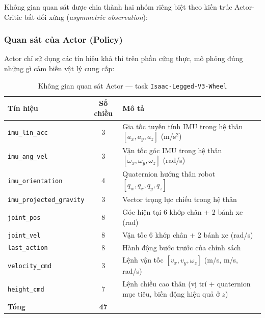 Không gian quan sát được chia thành hai nhóm riêng biệt theo kiến trúc
Actor-Critic bất đối xứng (\textit{asymmetric observation}):

\subsubsection{Quan sát của Actor (Policy)}

Actor chỉ sử dụng các tín hiệu khả thi trên phần cứng thực, mô phỏng
đúng những gì cảm biến vật lý cung cấp:

\begin{table}[H]
    \centering
    \caption{Không gian quan sát Actor --- task \texttt{Isaac-Legged-V3-Wheel}}
    \label{tab:obs_policy}
    \renewcommand{\arraystretch}{1.3}
    \begin{tabular}{|l|c|l|}
    \hline
    \textbf{Tín hiệu} & \textbf{Số chiều} & \textbf{Mô tả} \\
    \hline
    \texttt{imu\_lin\_acc}           & 3  & Gia tốc tuyến tính IMU trong hệ thân
                                            $[a_x, a_y, a_z]$ (m/s$^2$) \\
    \texttt{imu\_ang\_vel}           & 3  & Vận tốc góc IMU trong hệ thân
                                            $[\omega_x, \omega_y, \omega_z]$ (rad/s) \\
    \texttt{imu\_orientation}        & 4  & Quaternion hướng thân robot
                                            $[q_w, q_x, q_y, q_z]$ \\
    \texttt{imu\_projected\_gravity} & 3  & Vector trọng lực chiếu trong hệ thân \\
    \texttt{joint\_pos}              & 8  & Góc hiện tại 6 khớp chân + 2 bánh xe (rad) \\
    \texttt{joint\_vel}              & 8  & Vận tốc 6 khớp chân + 2 bánh xe (rad/s) \\
    \texttt{last\_action}            & 8  & Hành động bước trước của chính sách \\
    \texttt{velocity\_cmd}           & 3  & Lệnh vận tốc $[v_x, v_y, \omega_z]$
                                            (m/s, m/s, rad/s) \\
    \texttt{height\_cmd}             & 7  & Lệnh chiều cao thân (vị trí + quaternion
                                            mục tiêu, biến động hiệu quả ở $z$) \\
    \hline
    \textbf{Tổng}                    & \textbf{47} & \\
    \hline
    \end{tabular}
\end{table}

